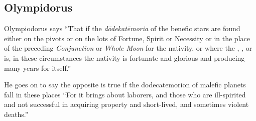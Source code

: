 \subsection{Olympidorus}
Olympiodorus says ``That if the \textsl{d\={o}dekat\={e}moria} of the benefic stars are found either on the pivots or on the lots of Fortune, Spirit or Necessity or in the place of the preceding \textsl{Conjunction} or \textsl{Whole Moon} for the nativity, or where the \Sun, \Moon, or \Mercury\, is, in these circumstances the nativity is fortunate and glorious and producing many years for itself.''

He goes on to say the opposite is true if the dodecatemorion of malefic planets fall in these places ``For it brings about laborers, and those who are ill-spirited and not successful in acquiring property and short-lived, and sometimes violent deaths.'' 
